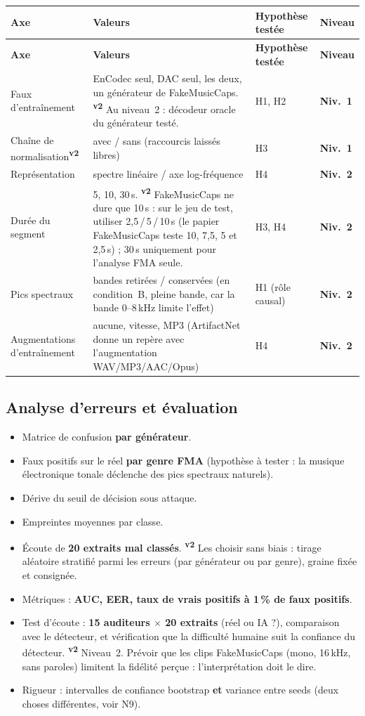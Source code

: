 \documentclass[11pt,a4paper]{article}
\newcommand{\vtwo}{\textsuperscript{\textcolor{orange!80!black}{\textbf{v2}}}}
\newcommand{\nA}{\textbf{Niv.~1}}  %
\newcommand{\nB}{\textbf{Niv.~2}}  %
\begin{document}
{\small
\begin{longtable}{L{3.0cm}L{7.2cm}L{2.8cm}L{1.9cm}}
\toprule
\textbf{Axe} & \textbf{Valeurs} & \textbf{Hypothèse testée} & \textbf{Niveau}\\
\midrule
\endfirsthead
\toprule
\textbf{Axe} & \textbf{Valeurs} & \textbf{Hypothèse testée} & \textbf{Niveau}\\
\midrule
\endhead
\bottomrule
\endfoot
Faux d'entraînement & EnCodec seul, DAC seul, les deux, un générateur de FakeMusicCaps. \vtwo{} Au niveau~2 : décodeur oracle du générateur testé. & H1, H2 & \nA\\
\addlinespace
Chaîne de normalisation\vtwo & avec / sans (raccourcis laissés libres) & H3 & \nA\\
\addlinespace
Représentation & spectre linéaire / axe log-fréquence & H4 & \nB\\
\addlinespace
Durée du segment & 5, 10, 30\,s. \vtwo{} FakeMusicCaps ne dure que 10\,s : sur le jeu de test, utiliser 2,5\,/\,5\,/\,10\,s (le papier FakeMusicCaps teste 10, 7,5, 5 et 2,5\,s) ; 30\,s uniquement pour l'analyse FMA seule. & H3, H4 & \nB\\
\addlinespace
Pics spectraux & bandes retirées / conservées (en condition~B, pleine bande, car la bande 0--8\,kHz limite l'effet) & H1 (rôle causal) & \nB\\
\addlinespace
Augmentations d'entraînement & aucune, vitesse, MP3 (ArtifactNet donne un repère avec l'augmentation WAV/MP3/AAC/Opus) & H4 & \nB\\
\end{longtable}}

\subsection{Analyse d'erreurs et évaluation}\label{sec:eval}
\begin{itemize}
\item Matrice de confusion \textbf{par générateur}.
\item Faux positifs sur le réel \textbf{par genre FMA} (hypothèse à tester : la musique électronique tonale déclenche des pics spectraux naturels).
\item Dérive du seuil de décision sous attaque.
\item Empreintes moyennes par classe.
\item Écoute de \textbf{20 extraits mal classés}. \vtwo{} Les choisir sans biais : tirage aléatoire stratifié parmi les erreurs (par générateur ou par genre), graine fixée et consignée.
\item Métriques : \textbf{AUC, EER, taux de vrais positifs à 1\,\% de faux positifs}.
\item Test d'écoute : \textbf{15 auditeurs $\times$ 20 extraits} (réel ou IA ?), comparaison avec le détecteur, et vérification que la difficulté humaine suit la confiance du détecteur. \vtwo{} Niveau~2. Prévoir que les clips FakeMusicCaps (mono, 16\,kHz, sans paroles) limitent la fidélité perçue : l'interprétation doit le dire.
\item Rigueur : intervalles de confiance bootstrap \textbf{et} variance entre seeds (deux choses différentes, voir N9).
\end{itemize}
\end{document}
